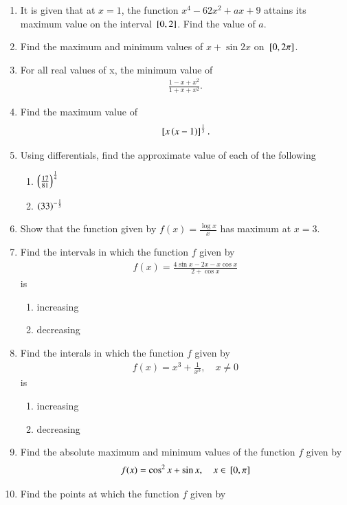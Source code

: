 \begin{enumerate}[label=\arabic*.,ref=\thesubsection.\theenumi]
\item It is given that at $x=1$, the function $x^4-62x^2 + ax+9$ attains its maximum value on the interval ${}\left[0,2\right]$.  Find the value of $a$.
\item Find the maximum and minimum values of $x + \sin 2x$ on ${}\left[0, 2\pi\right]$.
\item For all real values of x, the minimum value of
\begin{align}
\frac{1-x+x^2}{1+x+x^2}.
\end{align}
%
\item Find the maximum value of 
\begin{align}
{}\left[x\left(x-1\right)\right]^{\frac{1}{3}}.
\end{align}
\item Using differentials, find the approximate value of each of the following
%
\begin{enumerate}
\item $\left(\frac{17}{81}\right)^{\frac{1}{4}}$
\item $\left(33\right)^{-\frac{1}{5}}$
\end{enumerate}
%
\item Show that the function given by $f(x) = \frac{\log x}{x}$ has maximum at $x = 3$.
\item Find the intervals in which the function $f$ given by 
%
\begin{align}
f(x)  = \frac{4\sin x-2x - x\cos x}{2+\cos x}
\end{align}
%
is
%
\begin{enumerate}
\item increasing 
\item decreasing 
\end{enumerate}
%
\item Find the interals in which the function $f$ given by 
%
\begin{align}
f(x)  = x^3 + \frac{1}{x^3}, \quad x \ne 0
\end{align}
%
is
\begin{enumerate}
\item increasing 
\item decreasing 
\end{enumerate}
%
\item Find the absolute maximum and minimum values of the function $f$ given by 
%
\begin{align}
f(x)  = \cos^2 x + \sin x , \quad x \in {}\left[0,\pi\right]
\end{align}
%
\item Find the points at which the function $f$ given by 

\end{enumerate}
